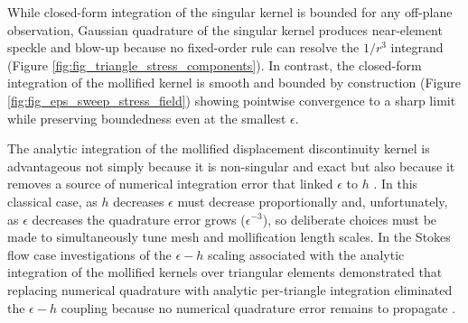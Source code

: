 \documentclass[12pt]{article}
\newcommand{\eps}{\epsilon}
\begin{document}
While closed-form integration of the singular kernel is bounded for any off-plane observation, Gaussian quadrature of the singular kernel produces near-element speckle and blow-up because no fixed-order rule can resolve the $1/r^{3}$ integrand (Figure \ref{fig:fig_triangle_stress_components}). In contrast, the closed-form integration of the mollified kernel is smooth and bounded by construction (Figure \ref{fig:fig_eps_sweep_stress_field}) showing pointwise convergence to a sharp limit while preserving boundedness even at the smallest $\eps$.

The analytic integration of the mollified displacement discontinuity kernel is advantageous not simply because it is non-singular and exact but also because it removes a source of numerical integration error that linked $\eps$ to $h$ \citep{CortezFauciMedovikov2005}. In this classical case, as $h$ decreases $\eps$ must decrease proportionally and, unfortunately, as $\eps$ decreases the quadrature error grows ($\eps^{-3}$), so deliberate choices must be made to simultaneously tune mesh and mollification length scales.  In the Stokes flow case investigations of the $\epsilon{-}h$ scaling associated with the analytic integration of the mollified kernels over triangular elements demonstrated that replacing numerical quadrature with analytic per-triangle integration eliminated the $\epsilon{-}h$ coupling because no numerical quadrature error remains to propagate \citep{FerrantiCortez2024}.
\end{document}
